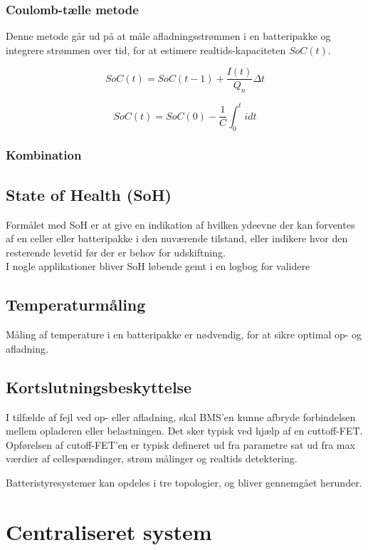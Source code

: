 \subsubsection{Coulomb-tælle metode}
Denne metode går ud på at måle afladningsstrømmen i en batteripakke og integrere strømmen over tid, for at estimere realtids-kapaciteten $SoC(t)$. 

\begin {equation} 
SoC(t) = SoC(t-1)+\frac{I(t)}{Q_n} \Delta t  \label{eq:coulomb-count}
\end {equation}

\begin {equation} 
SoC(t) = SoC(0) - \frac{1}{C} \int_{0}^{t} idt  \label{eq:coulomb-count_1}
\end {equation}


\subsubsection{Kombination}


\subsection{State of Health (SoH)}
Formålet med SoH er at give en indikation af hvilken ydeevne der kan forventes af en celler eller batteripakke i den nuværende tilstand, eller indikere hvor den resterende levetid før der er behov for udskiftning.
\\
I nogle applikationer bliver SoH løbende gemt i en logbog for validere

\subsection{Temperaturmåling}
Måling af temperature i en batteripakke er nødvendig, for at sikre optimal op- og afladning. 

\subsection{Kortslutningsbeskyttelse}
I tilfælde af fejl ved op- eller afladning, skal BMS'en kunne afbryde forbindelsen mellem opladeren eller belastningen. Det sker typisk ved hjælp af en cuttoff-FET. Opførelsen af cutoff-FET'en er typisk defineret ud fra parametre sat ud fra max værdier af cellespændinger, strøm målinger og realtids detektering. 

Batteristyresystemer kan opdeles i tre topologier, og bliver gennemgået herunder.
\section{Centraliseret system}

